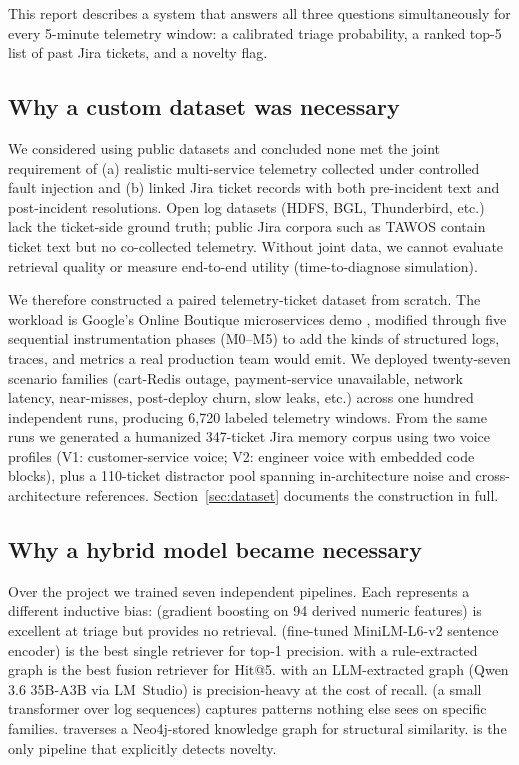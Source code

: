 This report describes a system that answers all three questions simultaneously for every 5-minute telemetry window: a calibrated triage probability, a ranked top-5 list of past Jira tickets, and a novelty flag.

\subsection{Why a custom dataset was necessary}

We considered using public datasets and concluded none met the joint requirement of (a) realistic multi-service telemetry collected under controlled fault injection and (b) linked Jira ticket records with both pre-incident text and post-incident resolutions. Open log datasets (HDFS, BGL, Thunderbird, etc.) lack the ticket-side ground truth; public Jira corpora such as TAWOS \cite{tawos} contain ticket text but no co-collected telemetry. Without joint data, we cannot evaluate retrieval quality or measure end-to-end utility (time-to-diagnose simulation).

We therefore constructed a paired telemetry-ticket dataset from scratch. The workload is Google's Online Boutique microservices demo \cite{online-boutique}, modified through five sequential instrumentation phases (M0--M5) to add the kinds of structured logs, traces, and metrics a real production team would emit. We deployed twenty-seven scenario families (cart-Redis outage, payment-service unavailable, network latency, near-misses, post-deploy churn, slow leaks, etc.) across one hundred independent runs, producing 6{,}720 labeled telemetry windows. From the same runs we generated a humanized 347-ticket Jira memory corpus using two voice profiles (V1: customer-service voice; V2: engineer voice with embedded code blocks), plus a 110-ticket distractor pool spanning in-architecture noise and cross-architecture references. Section~\ref{sec:dataset} documents the construction in full.

\subsection{Why a hybrid model became necessary}

Over the project we trained seven independent pipelines. Each represents a different inductive bias:
\hgb{} (gradient boosting on 94 derived numeric features) is excellent at triage but provides no retrieval.
\bienc{} (fine-tuned MiniLM-L6-v2 sentence encoder) is the best single retriever for top-1 precision.
\hrrf{} with a rule-extracted graph is the best fusion retriever for Hit@5.
\hrrf{} with an LLM-extracted graph (Qwen 3.6 35B-A3B via LM~Studio) is precision-heavy at the cost of recall.
\logseq{} (a small transformer over log sequences) captures patterns nothing else sees on specific families.
\kgret{} traverses a Neo4j-stored knowledge graph for structural similarity.
\agent{} is the only pipeline that explicitly detects novelty.

